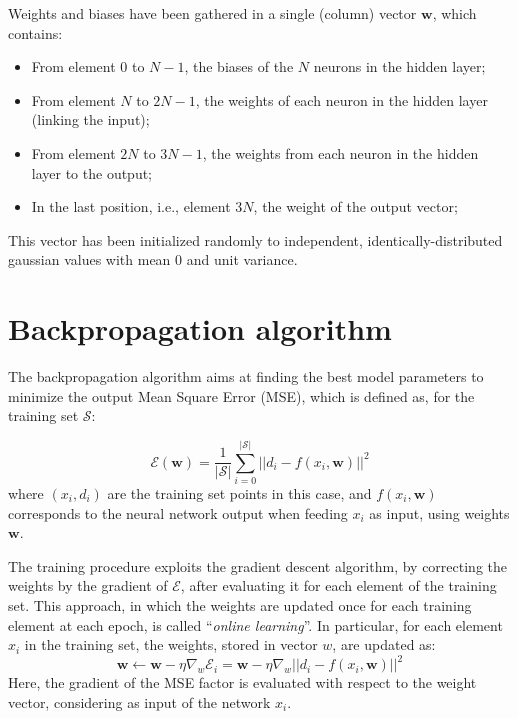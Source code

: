 \documentclass[12pt]{article}
\begin{document}
Weights and biases have been gathered in a single (column) vector $\textbf{w}$, which contains:
\begin{itemize}
  \item From element $0$ to $N-1$, the biases of the $N$ neurons in the hidden layer;
  \item From element $N$ to $2N-1$, the weights of each neuron in the hidden layer (linking the input);
  \item From element $2N$ to $3N-1$, the weights from each neuron in the hidden layer to the output;
  \item In the last position, i.e., element $3N$, the weight of the output vector;
\end{itemize}
This vector has been initialized randomly to independent, identically-distributed gaussian values with mean $0$ and unit variance.

\section{Backpropagation algorithm}\label{sec:bp}

The backpropagation algorithm aims at finding the best model parameters to minimize the output Mean Square Error (MSE), which is defined as, for the training set $\mathcal{S}$:

\begin{equation}
  \mathcal{E}(\textbf{w}) = \frac{1}{|\mathcal{S}|} \sum_{i=0}^{|\mathcal{S}|} {|| d_i - f(x_i, \textbf{w}) ||^2}
\end{equation}
where $(x_i, d_i)$ are the training set points in this case, and $f(x_i, \textbf{w})$ corresponds to the neural network output when feeding $x_i$ as input, using weights $\textbf{w}$.

The training procedure exploits the gradient descent algorithm, by correcting the weights by the gradient of $\mathcal{E}$, after evaluating it for each element of the training set.
This approach, in which the weights are updated once for each training element at each epoch, is called ``\textit{online learning}''.
In particular, for each element $x_i$ in the training set, the weights, stored in vector $w$, are updated as:
\begin{equation}
  \textbf{w} \leftarrow \textbf{w} - \eta \nabla_{w}\mathcal{E}_i = \textbf{w} - \eta \nabla_{w}||d_i - f(x_i, \textbf{w})||^2
\end{equation}
Here, the gradient of the MSE factor is evaluated with respect to the weight vector, considering as input of the network $x_i$.
\end{document}
